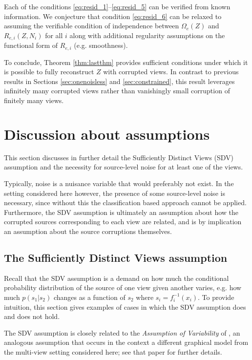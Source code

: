 Each of the conditions \ref{eq:resid_1}--\ref{eq:resid_5} can be verified from known information.
We conjecture that condition \ref{eq:resid_6} can be relaxed to assuming the verifiable condition of independence between $\Omega_{e}(Z)$ and $R_{e, i}(Z, N_i)$ for all $i$ along with additional regularity assumptions on the functional form of $R_{e, i}$ (e.g. smoothness).

To conclude, Theorem \ref{thm:lastthm} provides sufficient conditions under which it is possible to fully reconstruct $Z$ with corrupted views.
In contrast to previous results in Sections \ref{sec:onenoisless} and \ref{sec:constrained}, this result leverages infinitely many corrupted views rather than vanishingly small corruption of finitely many views.




\section{Discussion about assumptions}\label{sec:ica-assumptions}

This section discusses in further detail the Sufficiently Distinct Views (SDV) assumption and the necessity for source-level noise for at least one of the views.

Typically, noise is a nuisance variable that would preferably not exist.
In the setting considered here however, the presence of some source-level noise is necessary, since without this the classification based approach cannot be applied.
Furthermore, the SDV assumption is ultimately an assumption about how the corrupted sources corresponding to each view are related, and is by implication an assumption about the source corruptions themselves.



\subsection{The Sufficiently Distinct Views assumption}
\label{appendix:sdv}

Recall that the SDV assumption is a demand on how much the conditional probability distribution of the source of one view given another varies, e.g. how much $p(s_1 | s_2)$ changes as a function of $s_2$ where $s_i = f_i^{-1}(x_i)$. 
To provide intuition, this section gives examples of cases in which the SDV assumption does and does not hold.

The SDV assumption is closely related to the \emph{Assumption of Variability} of \cite{hyvarinen19a}, an analogous assumption that occurs in the context a different graphical model from the multi-view setting considered here; see that paper for further details.




